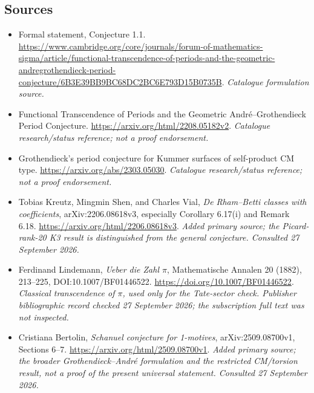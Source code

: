 \documentclass[11pt,a4paper]{article}
\numberwithin{equation}{section}
\begin{document}
\subsection{Sources}
\begin{itemize}\raggedright
\item[\textnormal{[S1]}]\hypertarget{source:30006975:1}{} Formal statement, Conjecture 1.1.
\url{https://www.cambridge.org/core/journals/forum-of-mathematics-sigma/article/functional-transcendence-of-periods-and-the-geometric-andregrothendieck-period-conjecture/6B3E39BB9BC68DC2BC6E793D15B0735B}.
{\small\textit{Catalogue formulation source.}}
\item[\textnormal{[S2]}]\hypertarget{source:30006975:2}{} Functional Transcendence of Periods and the Geometric André--Grothendieck Period Conjecture.
\url{https://arxiv.org/html/2208.05182v2}.
{\small\textit{Catalogue research/status reference; not a proof endorsement.}}
\item[\textnormal{[S3]}]\hypertarget{source:30006975:3}{} Grothendieck's period conjecture for Kummer surfaces of self-product CM type.
\url{https://arxiv.org/abs/2303.05030}.
{\small\textit{Catalogue research/status reference; not a proof endorsement.}}
\item[\textnormal{[E1]}]\hypertarget{extra:30006975:1}{} Tobias Kreutz, Mingmin Shen, and Charles Vial, \emph{De Rham--Betti classes with coefficients}, arXiv:2206.08618v3, especially Corollary 6.17(i) and Remark 6.18.
\url{https://arxiv.org/html/2206.08618v3}.
{\small\textit{Added primary source; the Picard-rank-20 K3 result is distinguished from the general conjecture. Consulted 27 September 2026.}}
\item[\textnormal{[E2]}]\hypertarget{extra:30006975:2}{} Ferdinand Lindemann, \emph{Ueber die Zahl $\pi$}, Mathematische Annalen 20 (1882), 213--225, DOI:10.1007/BF01446522.
\url{https://doi.org/10.1007/BF01446522}.
{\small\textit{Classical transcendence of $\pi$, used only for the Tate-sector check. Publisher bibliographic record checked 27 September 2026; the subscription full text was not inspected.}}
\item[\textnormal{[E3]}]\hypertarget{extra:30006975:3}{} Cristiana Bertolin, \emph{Schanuel conjecture for 1-motives}, arXiv:2509.08700v1, Sections 6--7.
\url{https://arxiv.org/html/2509.08700v1}.
{\small\textit{Added primary source; the broader Grothendieck--Andr\'e formulation and the restricted CM/torsion result, not a proof of the present universal statement. Consulted 27 September 2026.}}
\end{itemize}
\end{document}
